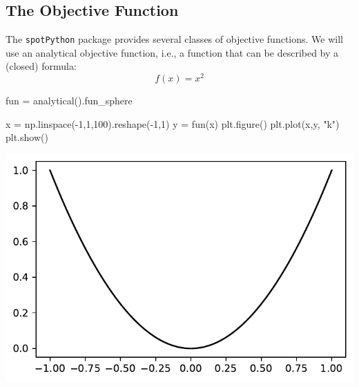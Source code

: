 \documentclass[
  letterpaper,
  DIV=11,
  numbers=noendperiod]{scrreprt}
\newenvironment{Shaded}{\begin{snugshade}}{\end{snugshade}}
\newcommand{\DecValTok}[1]{\textcolor[rgb]{0.68,0.00,0.00}{#1}}
\newcommand{\NormalTok}[1]{\textcolor[rgb]{0.00,0.23,0.31}{#1}}
\newcommand{\OperatorTok}[1]{\textcolor[rgb]{0.37,0.37,0.37}{#1}}
\newcommand{\StringTok}[1]{\textcolor[rgb]{0.13,0.47,0.30}{#1}}
\begin{document}
\subsection{The Objective Function}\label{the-objective-function}

The \texttt{spotPython} package provides several classes of objective
functions. We will use an analytical objective function, i.e., a
function that can be described by a (closed) formula: \[f(x) = x^2\]

\begin{Shaded}
\begin{Highlighting}[]
\NormalTok{fun }\OperatorTok{=}\NormalTok{ analytical().fun\_sphere}
\end{Highlighting}
\end{Shaded}

\begin{Shaded}
\begin{Highlighting}[]
\NormalTok{x }\OperatorTok{=}\NormalTok{ np.linspace(}\OperatorTok{{-}}\DecValTok{1}\NormalTok{,}\DecValTok{1}\NormalTok{,}\DecValTok{100}\NormalTok{).reshape(}\OperatorTok{{-}}\DecValTok{1}\NormalTok{,}\DecValTok{1}\NormalTok{)}
\NormalTok{y }\OperatorTok{=}\NormalTok{ fun(x)}
\NormalTok{plt.figure()}
\NormalTok{plt.plot(x,y, }\StringTok{"k"}\NormalTok{)}
\NormalTok{plt.show()}
\end{Highlighting}
\end{Shaded}

\includegraphics{a_04_spot_doc_files/figure-pdf/cell-4-output-1.pdf}
\end{document}
